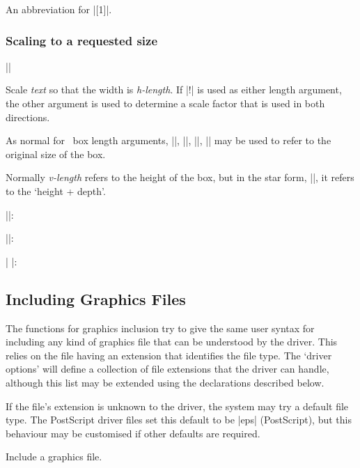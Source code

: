 An abbreviation for |\scalebox{-1}[1]|.

\subsubsection{Scaling to a requested size}

\begin{decl}
|\resizebox|\star{}
\end{decl}

 Scale \emph{text} so that the width is \emph{h-length}.
 If |!| is used as either length argument, the other argument is used
 to determine a scale factor that is used in both directions.
 
 As normal for \LaTeXe\ box length arguments, |\height|,
 |\width|, |\totalheight|, |\depth| may be used to refer to the
 original size of the box.

 Normally \emph{v-length} refers to the height of the box, but in the
 star form, |\resizebox*|, it refers to the `height +  depth'.
 
||:

||:

| |:
 

\subsection{Including Graphics Files}
The functions for graphics inclusion try to give the same user syntax
for including any kind of graphics file that can be understood by the
driver. This relies on the file having an extension that identifies
the file type. The `driver options' will define a collection of file
extensions that the driver can handle, although this list may be
extended using the declarations described below.

If the file's extension is unknown to the driver, the system may try a
default file type. The PostScript driver files set this default to be
|eps| (PostScript), but this behaviour may be customised if other
defaults are required.

 Include a graphics file.

